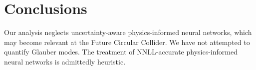 \section{Conclusions}\label{sec:conclusions}

Our analysis neglects uncertainty-aware physics-informed neural
networks, which may become relevant at the Future Circular Collider. We
have not attempted to quantify Glauber modes. The treatment of
NNLL-accurate physics-informed neural networks is admittedly heuristic.

